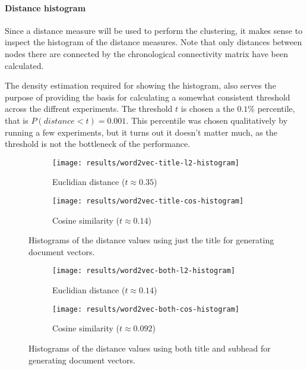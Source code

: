 \paragraph{Distance histogram} Since a distance measure will be used to perform the clustering, it makes sense to inspect the histogram of the distance measures. Note that only distances between nodes there are connected by the chronological connectivity matrix have been calculated.

The density estimation required for showing the histogram, also serves the purpose of providing the basis for calculating a somewhat consistent threshold across the diffrent experiments. The threshold $t$ is chosen a the $0.1 \%$ percentile, that is $P(distance < t) = 0.001$. This percentile was chosen qualitatively by running a few experiments, but it turns out it doesn't matter much, as the threshold is not the bottleneck of the performance.

\begin{figure}[H]
        \centering
        \begin{subfigure}[b]{0.49\textwidth}
                \texttt{[image: results/word2vec-title-l2-histogram]}
                \caption{Euclidian distance ($t \approx 0.35$)}
        \end{subfigure}
        \begin{subfigure}[b]{0.49\textwidth}
                \texttt{[image: results/word2vec-title-cos-histogram]}
                \caption{Cosine similarity ($t \approx 0.14$)}
        \end{subfigure}
        \caption{Histograms of the distance values using just the title for generating document vectors.}
\end{figure}
\begin{figure}[H]
        \centering
        \begin{subfigure}[b]{0.49\textwidth}
                \texttt{[image: results/word2vec-both-l2-histogram]}
                \caption{Euclidian distance ($t \approx 0.14$)}
        \end{subfigure}
        \begin{subfigure}[b]{0.49\textwidth}
                \texttt{[image: results/word2vec-both-cos-histogram]}
                \caption{Cosine similarity ($t \approx 0.092$)}
        \end{subfigure}
        \caption{Histograms of the distance values using both title and subhead for generating document vectors.}
\end{figure}

